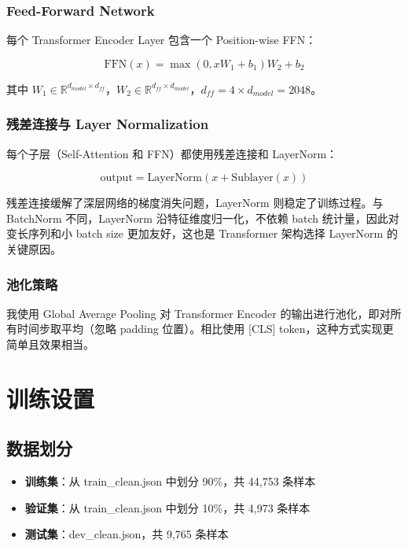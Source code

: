 \documentclass[a4paper]{article}
\begin{document}
\subsubsection{Feed-Forward Network}

每个 Transformer Encoder Layer 包含一个 Position-wise FFN：

\begin{equation}
\text{FFN}(x) = \max(0, x W_1 + b_1) W_2 + b_2
\end{equation}

其中 $W_1 \in \mathbb{R}^{d_{model} \times d_{ff}}$，$W_2 \in \mathbb{R}^{d_{ff} \times d_{model}}$，$d_{ff} = 4 \times d_{model} = 2048$。

\subsubsection{残差连接与 Layer Normalization}

每个子层（Self-Attention 和 FFN）都使用残差连接和 LayerNorm\cite{ba2016layernorm}：

\begin{equation}
\text{output} = \text{LayerNorm}(x + \text{Sublayer}(x))
\end{equation}

残差连接缓解了深层网络的梯度消失问题，LayerNorm\cite{ba2016layernorm} 则稳定了训练过程。与 BatchNorm 不同，LayerNorm 沿特征维度归一化，不依赖 batch 统计量，因此对变长序列和小 batch size 更加友好，这也是 Transformer 架构选择 LayerNorm 的关键原因。

\subsubsection{池化策略}

我使用 Global Average Pooling 对 Transformer Encoder 的输出进行池化，即对所有时间步取平均（忽略 padding 位置）。相比使用 [CLS] token，这种方式实现更简单且效果相当。

\section{训练设置}

\subsection{数据划分}

\begin{itemize}
    \item \textbf{训练集}：从 train\_clean.json 中划分 90\%，共 44,753 条样本
    \item \textbf{验证集}：从 train\_clean.json 中划分 10\%，共 4,973 条样本
    \item \textbf{测试集}：dev\_clean.json，共 9,765 条样本
\end{itemize}
\end{document}

